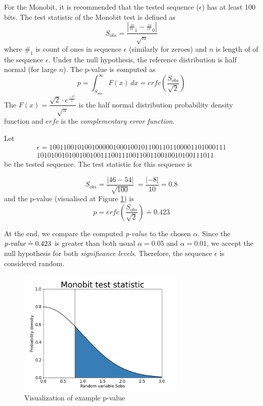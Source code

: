 \documentclass[
  digital,     %
  oneside,     %
  nosansbold,  %
  nocolorbold, %
  nolof,         %
  nolot,         %
]{fithesis4}
\begin{document}
For the Monobit, it is recommended that the tested sequence ($\epsilon$) has at least 100 bits. The test statistic of the Monobit test is defined as \[S_{obs} = \dfrac{|\#_1 - \#_0|}{\sqrt{n}}\] where $\#_1$ is count of ones in sequence $\epsilon$ (similarly for zeroes) and $n$ is length of of the sequence $\epsilon$. Under the null hypothesis, the reference distribution is half normal (for large $n$). The p-value is computed as \[ p = \int_{S_{obs}}^{\infty} F(x) \,dx = erfc(\dfrac{S_{obs}}{\sqrt{2}}) \] The $F(x) = \dfrac{\sqrt{2}\cdot e^{\frac{-x^2}{2}}}{\sqrt{\pi}}$ is the half normal distribution probability density function and $erfc$ is the \emph{complementary error function}.

 Let
\[\begin{split}
    \epsilon = 10011001010010000010001001011001101100001101000111\\10101001010010010011100111001100110010010100111011
\end{split}\]
 be the tested sequence. The test statistic for this sequence is 

 \[S_{obs} = \dfrac{|46 - 54|}{\sqrt{100}}\ = \dfrac{|-8|}{10} = 0.8\]
 and the p-value (visualised at Figure \ref{fig:example}) is 
 \[p = erfc(\dfrac{S_{obs}}{\sqrt{2}}) \doteq 0.423\]

At the end, we compare the computed \emph{p-value} to the chosen $\alpha$. Since the $\emph{p-value} \doteq 0.423$ is greater than both usual $\alpha = 0.05$ and $\alpha = 0.01$, we accept the null hypothesis for both \emph{significance levels}. Therefore, the sequence $\epsilon$ is considered random.

\begin{figure}
  \begin{center}
    \includegraphics[width=8cm]{figures/test_example.png}
  \end{center}
  \caption{Visualization of example p-value}
  \label{fig:example}
\end{figure}
\end{document}
